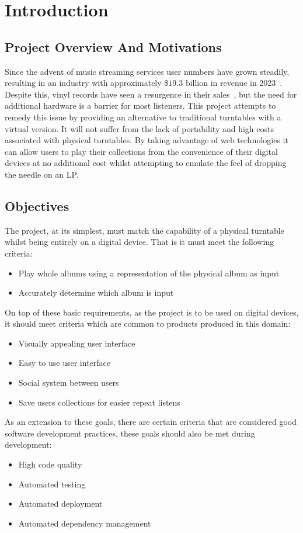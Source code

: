 \chapter{Introduction}\label{cha:intro}

\section{Project Overview And Motivations}
Since the advent of music streaming services user numbers have grown steadily, resulting in an industry with approximately \$$19.3$ billion in revenue in 2023~\cite{IFPI}. Despite this, vinyl records have seen a resurgence in their sales~\cite{BPI}, but the need for additional hardware is a barrier for most listeners.
This project attempts to remedy this issue by providing an alternative to traditional turntables with a virtual version. It will not suffer from the lack of portability and high costs associated with physical turntables. By taking advantage of web technologies it can allow users to play their collections from the convenience of their digital devices at no additional cost whilst attempting to emulate the feel of dropping the needle on an LP.

\section{Objectives}\label{sec:objectives}
The project, at its simplest, must match the capability of a physical turntable whilst being entirely on a digital device. That is it must meet the following criteria:
\begin{itemize}
    \item Play whole albums using a representation of the physical album as input
    \item Accurately determine which album is input
\end{itemize}
On top of these basic requirements, as the project is to be used on digital devices, it should meet criteria which are common to products produced in this domain:
\begin{itemize}
    \item Visually appealing user interface
    \item Easy to use user interface
    \item Social system between users
    \item Save users collections for easier repeat listens
\end{itemize}
As an extension to these goals, there are certain criteria that are considered good software development practices, these goals should also be met during development:
\begin{itemize}
    \item High code quality
    \item Automated testing
    \item Automated deployment
    \item Automated dependency management
\end{itemize}

